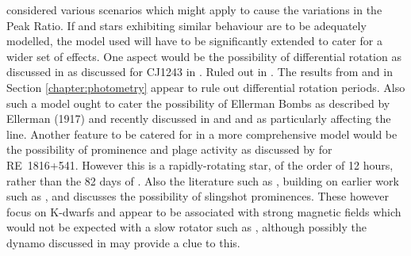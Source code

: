 {\FirstP} considered various scenarios which might apply to cause the variations in the Peak Ratio. If {\prox} and stars
exhibiting similar behaviour are to be adequately modelled, the model used will have to be significantly extended to
cater for a wider set of effects. One aspect would be the possibility of differential rotation as discussed in as
discussed for CJ1243 in \citet{davenport15}. Ruled out in \citet{barnes05}.
The results from {\hst} and {\asas} in Section \ref{chapter:photometry} appear to rule out differential rotation periods.
Also such a model ought to cater the possibility of Ellerman Bombs as described by Ellerman (1917) and recently
discussed in \citet{rutten13} and \citet{vissers15} and \citet{rutten16} as particularly affecting the {\ha} line.
Another feature to be catered for in a more comprehensive model would be the possibility of prominence and plage
activity as discussed by \citet{eibe98} for RE~1816+541. However this is a rapidly-rotating star, of the order of 12
hours, rather than the 82 days of \prox. Also the literature such as \citet{skelly09}, building on earlier work such as
\citet{donati99}, \citet{dunstone06} and \citet{colliercameron89} discusses the possibility of slingshot
prominences. These however focus on K-dwarfs and appear to be associated with strong magnetic fields which would not be
expected with a slow rotator such as \prox, although possibly the dynamo discussed in \citet{yadav16} may provide a clue
to this.


